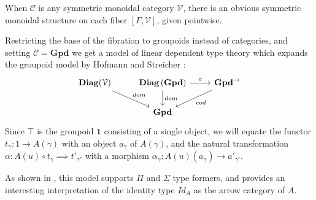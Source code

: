 \documentclass[a4paper,english]{lipics-v2018}
\DeclareMathOperator{\diag}{\mathbf{Diag}}
\begin{document}
When $\mathcal{C}$ is any symmetric monoidal category $\mathcal{V}$, there is an obvious symmetric monoidal structure on each fiber $[\Gamma, \mathcal{V}]$, given pointwise.

Restricting the base of the fibration to groupoids instead of categories, and setting $\mathcal{C} = \mathbf{Gpd}$ we get a model of linear dependent type theory which expands the groupoid model by Hofmann and Streicher \cite{hofmann1998}:
\[
\begin{tikzcd}
\diag(\mathcal{V}) \ar[rd, "dom"]  & \diag{\mathbf{(Gpd)}} \ar[d, "dom"] \ar[r, "\pi"] & \mathbf{Gpd}^\to \ar[ld, "cod"] \\
& \mathbf{Gpd}
\end{tikzcd}
\]
Since $\top$ is the groupoid $\mathbf{1}$ consisting of a single object, we will equate the functor $t_\gamma : 1 \to A(\gamma)$ with an object $a_\gamma$ of $A(\gamma)$, and the natural transformation $\alpha : A(u) \circ t_\gamma \implies t'_{\gamma'}$ with a morphism $\alpha_\gamma : A(u)(a_\gamma) \to a'_{\gamma'}$.

As shown in \cite{hofmann1998}, this model supports $\Pi$ and $\Sigma$ type formers, and provides an interesting interpretation of the identity type $Id_A$ as the arrow category of $A$.
\end{document}
